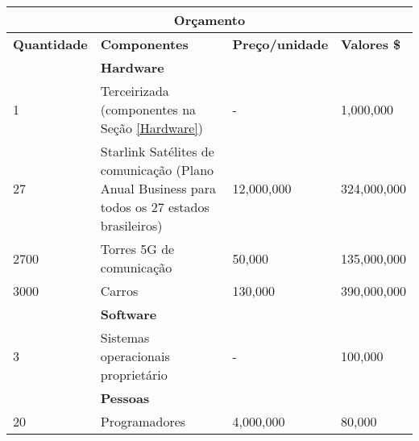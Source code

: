 \begin{tabular}{ |p{3cm}||p{3cm}|p{3cm}|p{3cm}|  }
      \hline
      \multicolumn{4}{|c|}{Or\c{c}amento}                                                                                                                                                 \\
      \hline
      \textbf{Quantidade} & \textbf{Componentes}                                                                          & \textbf{Preço/unidade} & \textbf{Valores \$}                  \\
      \hline
                          & \textbf{Hardware}                                                                             &                        &                                      \\
      1                   & Terceirizada (componentes na Seção \ref{Hardware})                                            & -                      & 1,000,000                            \\
      27                  & Starlink Satélites de comunicação (Plano Anual Business para todos os 27 estados brasileiros) & 12,000,000             & 324,000,000                          \\
      2700                & Torres 5G de comunicação                                                                      & 50,000                 & 135,000,000                           \\
      3000                & Carros                                                                                        & 130,000                & 390,000,000                          \\
                          & \textbf{Software}                                                                             &                        &                                      \\
      3                   & Sistemas operacionais proprietário                                                            & -                      & 100,000                              \\
                          & \textbf{Pessoas}                                                                              &                        &                                      \\
      20                  & Programadores                                                                                 & 4,000,000              & 80,000                               \\

\end{tabular}
